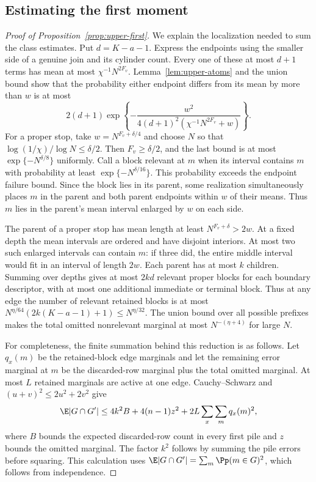 \subsection{Estimating the first moment}
\begin{proof}[Proof of Proposition~\ref{prop:upper-first}]
We explain the localization needed to sum the class estimates.
Put $d=K-a-1$. Express the endpoints using the smaller side of a
genuine join and its cylinder count. Every one of these at most
$d+1$ terms has mean at most $\chi^{-1}N^{2F_v}$.
Lemma~\ref{lem:upper-atoms} and the union bound show that the
probability either endpoint differs from its mean by more than $w$
is at most
\[
 2(d+1)\exp\left\{-\frac{w^2}
                {4(d+1)^2(\chi^{-1}N^{2F_v}+w)}\right\}.
\]
For a proper stop, take $w=N^{F_v+\delta/4}$ and choose $N$ so that
$\log(1/\chi)/\log N\le\delta/2$. Then $F_v\ge\delta/2$,
and the last bound is at most $\exp\{-N^{\delta/8}\}$ uniformly.
Call a block relevant at $m$ when its interval contains $m$ with
probability at least $\exp\{-N^{\delta/16}\}$. This probability
exceeds the endpoint failure bound. Since the block lies in its
parent, some realization simultaneously places $m$ in the parent
and both parent endpoints within $w$ of their means. Thus $m$ lies
in the parent's mean interval enlarged by $w$ on each side.

The parent of a proper stop has mean length at least
$N^{F_v+\delta}>2w$. At a fixed depth the mean intervals are
ordered and have disjoint interiors. At most two such enlarged
intervals can contain $m$: if three did, the entire middle interval
would fit in an interval of length $2w$. Each parent has at most
$k$ children. Summing over depths gives at most $2kd$ relevant
proper blocks for each boundary descriptor, with at most one
additional immediate or terminal block. Thus at any edge the number of relevant retained
blocks is at most
$N^{\eta/64}(2k(K-a-1)+1)\le N^{\eta/32}$.
The union bound over all possible prefixes makes the total omitted
nonrelevant marginal at most $N^{-(\eta+4)}$ for large $N$.

For completeness, the finite summation behind this reduction is as
follows. Let $q_x(m)$ be the retained-block edge marginals and let
the remaining error marginal at $m$ be the discarded-row marginal
plus the total omitted marginal. At most $L$ retained marginals are
active at one edge. Cauchy--Schwarz and $(u+v)^2\le2u^2+2v^2$ give
\[
 \E|G\cap G'|
 \le4k^2 B+4(n-1)z^2+2L\sum_x\sum_m q_x(m)^2,
\]
where $B$ bounds the expected discarded-row count in every first
pile and $z$ bounds the omitted marginal. The factor $k^2$ follows
by summing the pile errors before squaring. This calculation uses
$\E|G\cap G'|=\sum_m\Pp(m\in G)^2$, which follows from independence.


\end{proof}
